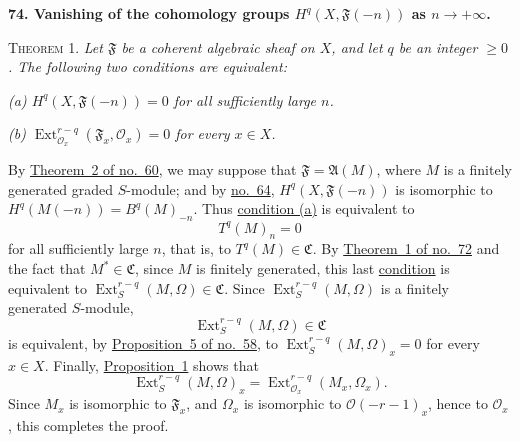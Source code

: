 
\medskip
{}\label{fac:III:5:no:74}
\textbf{74. Vanishing of the cohomology groups
$H^q(X,\mathfrak F(-n))$ as $n\longrightarrow+\infty$.}

\label{fac:III:5:no:74:thm:1}
\textsc{Theorem 1.} \textit{Let $\mathfrak F$ be a coherent algebraic
sheaf on $X$, and let $q$ be an integer $\geq0$. The following two
conditions are equivalent:}

\label{fac:III:5:no:74:thm:1:a}
\textit{(a) $H^q(X,\mathfrak F(-n))=0$ for all sufficiently large $n$.}

\label{fac:III:5:no:74:thm:1:b}
\textit{(b) $\operatorname{Ext}_{\mathcal O_x}^{r-q}
(\mathfrak F_x,\mathcal O_x)=0$ for every $x\in X$.}

By \hyperref[fac:III:2:no:60:theorem:2]{Theorem~2 of no.~60}, we may
suppose that $\mathfrak F=\mathfrak A(M)$, where $M$ is a finitely
generated graded $S$-module; and by
\hyperref[fac:III:3:no:64:cor]{no.~64},
$H^q(X,\mathfrak F(-n))$ is isomorphic to
$H^q(M(-n))=B^q(M)_{-n}$. Thus
\hyperref[fac:III:5:no:74:thm:1:a]{condition (a)} is equivalent to
\label{fac:III:5:no:74:formula:T-vanishing}
\[
T^q(M)_n=0
\]
for all sufficiently large $n$, that is, to
\label{fac:III:5:no:74:condition:T-in-C}
$T^q(M)\in\mathfrak C$.
By \hyperref[fac:III:4:no:72:thm:1]{Theorem~1 of no.~72} and the fact
that $M^*\in\mathfrak C$, since $M$ is finitely generated, this last
\hyperref[fac:III:5:no:74:condition:T-in-C]{condition} is equivalent to
$\operatorname{Ext}_S^{r-q}(M,\Omega)\in\mathfrak C$. Since
$\operatorname{Ext}_S^{r-q}(M,\Omega)$ is a finitely generated
$S$-module,
\label{fac:III:5:no:74:formula:Ext-in-C}
\[
\operatorname{Ext}_S^{r-q}(M,\Omega)\in\mathfrak C
\]
is equivalent, by
\hyperref[fac:III:2:no:58:prop:5]{Proposition~5 of no.~58}, to
$\operatorname{Ext}_S^{r-q}(M,\Omega)_x=0$ for every $x\in X$.
Finally, \hyperref[fac:III:5:no:73:prop:1]{Proposition~1} shows that
\[
\operatorname{Ext}_S^{r-q}(M,\Omega)_x
=\operatorname{Ext}_{\mathcal O_x}^{r-q}(M_x,\Omega_x).
\]
Since $M_x$ is isomorphic to $\mathfrak F_x$, and $\Omega_x$ is
isomorphic to $\mathcal O(-r-1)_x$, hence to $\mathcal O_x$, this
completes the proof.

